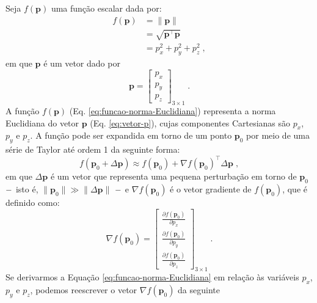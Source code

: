 \documentclass[10pt,a4paper,fleqn]{article}
\begin{document}
Seja $f(\mathbf{p})$ uma funç\~{a}o escalar dada por:
\begin{equation}
\begin{split}
f(\mathbf{p}) & = \| \mathbf{p} \| \\
              & = \sqrt{\mathbf{p}^{\intercal} \mathbf{p}} \\
              & = p_{x}^{2} + p_{y}^{2} + p_{z}^{2} \; ,
\end{split}
\label{eq:funcao-norma-Euclidiana}
\end{equation}
em que $\mathbf{p}$ é um vetor dado por
\begin{equation}
\mathbf{p} = 
\left[
\begin{array}{c}
p_{x} \\
p_{y} \\
p_{z}
\end{array}
\right]_{3 \times 1} \; .
\label{eq:vetor-p}
\end{equation}
A funç\~{a}o $f(\mathbf{p})$ (Eq. \ref{eq:funcao-norma-Euclidiana}) representa a norma Euclidiana 
do vetor $\mathbf{p}$ (Eq. \ref{eq:vetor-p}), cujas componentes Cartesianas são $p_{x}$, 
$p_{y}$ e $p_{z}$. A funç\~{a}o pode ser expandida em torno de um ponto $\mathbf{p}_{0}$ 
por meio de uma s\'{e}rie de Taylor at\'{e} ordem 1 da seguinte forma:
\begin{equation}
f(\mathbf{p}_{0} + \Delta\mathbf{p}) \approx
f(\mathbf{p}_{0}) + 
\nabla f(\mathbf{p}_{0})^{\intercal} \Delta\mathbf{p} \; ,
\label{eq:funcao-f-Taylor}
\end{equation}
em que $\Delta\mathbf{p}$ é um vetor que representa uma pequena perturbaç\~{a}o
em torno de $\mathbf{p}_{0}$ $\--$ isto \'{e}, $\| \mathbf{p}_{0} \| \gg \| 
\Delta \mathbf{p} \|$ $\--$
e $\nabla f(\mathbf{p}_{0})$ \'{e} o vetor gradiente
de $f(\mathbf{p}_{0})$, que \'{e} definido como:
\begin{equation}
\nabla f(\mathbf{p}_{0}) =
\left[
\begin{array}{c}
\frac{\partial f(\mathbf{p}_{0})}{\partial p_{x}} \\
\frac{\partial f(\mathbf{p}_{0})}{\partial p_{y}} \\
\frac{\partial f(\mathbf{p}_{0})}{\partial p_{z}}
\end{array}
\right]_{3 \times 1} \; .
\label{eq:gradiente-f}
\end{equation}
Se derivarmos a Equaç\~{a}o \ref{eq:funcao-norma-Euclidiana} em relaç\~{a}o \`{a}s vari\'{a}veis
$p_{x}$, $p_{y}$ e $p_{z}$, podemos reescrever o vetor $\nabla f(\mathbf{p}_{0})$ da seguinte 
\end{document}
